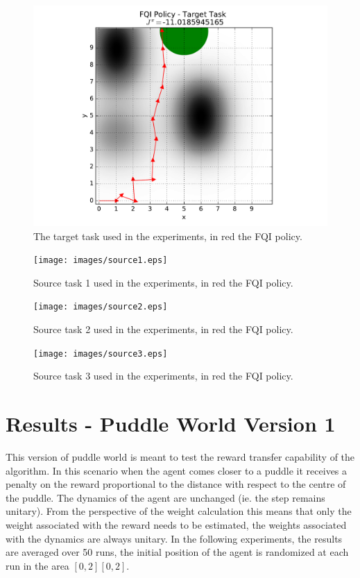     \begin{figure}[H]
      \centering
      \includegraphics[scale=0.6]{images/target.pdf}
      \caption{The target task used in the experiments, in red the FQI policy.}
      \label{target}
    \end{figure}
    \begin{figure}[H]
      \centering
      \texttt{[image: images/source1.eps]}
      \caption{Source task 1 used in the experiments, in red the FQI policy.}
      \label{source1}
    \end{figure}
    \begin{figure}[H]
      \centering
      \texttt{[image: images/source2.eps]}
      \caption{Source task 2 used in the experiments, in red the FQI policy.}
      \label{source2}
    \end{figure}
    \begin{figure}[H]
      \centering
      \texttt{[image: images/source3.eps]}
      \caption{Source task 3 used in the experiments, in red the FQI policy.}
      \label{source3}
    \end{figure}

  \section{Results - Puddle World Version 1}
    \noindent This version of puddle world is meant to test the reward transfer capability of the algorithm. In this scenario when the
    agent comes closer to a puddle it receives a penalty on the reward proportional to the distance with respect
    to the centre of the puddle. The dynamics of the agent are unchanged (ie. the step remains unitary).\newline
    From the perspective of the weight calculation this means that only the weight associated with the reward needs to be estimated,
    the weights associated with the dynamics are always unitary.\newline
    In the following experiments, the results are averaged over 50 runs, the initial position of the agent is randomized
    at each run in the area $[0,2][0,2]$.\newline

